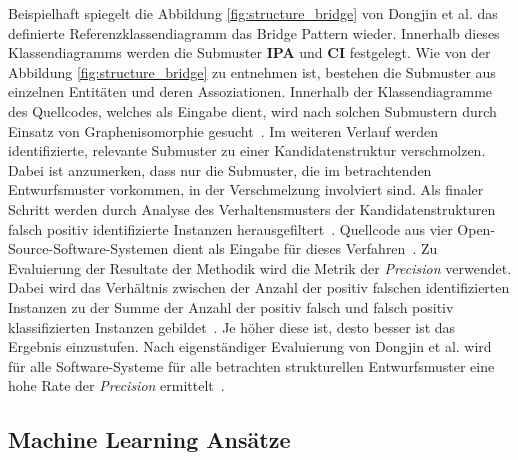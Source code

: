 Beispielhaft spiegelt die Abbildung \ref{fig:structure_bridge} von Dongjin et al. das definierte Referenzklassendiagramm das Bridge Pattern wieder. Innerhalb dieses Klassendiagramms werden die Submuster \textbf{IPA} und \textbf{CI} festgelegt. Wie von der Abbildung \ref{fig:structure_bridge} zu entnehmen ist, bestehen die Submuster aus einzelnen Entitäten und deren Assoziationen.
Innerhalb der Klassendiagramme des Quellcodes, welches als Eingabe dient, wird nach solchen Submustern durch Einsatz von Graphenisomorphie gesucht~\cite[S. 584]{6649882}. Im weiteren Verlauf werden identifizierte, relevante Submuster zu einer Kandidatenstruktur verschmolzen. Dabei ist anzumerken, dass nur die Submuster, die im betrachtenden Entwurfsmuster vorkommen, in der Verschmelzung involviert sind.
Als finaler Schritt werden durch Analyse des Verhaltensmusters der Kandidatenstrukturen falsch positiv identifizierte Instanzen herausgefiltert~\cite[S. 584]{6649882}. Quellcode aus vier Open-Source-Software-Systemen dient als Eingabe für dieses Verfahren~\cite[S. 585]{6649882}. 
Zu Evaluierung der Resultate der Methodik wird die Metrik der \textit{Precision} verwendet. Dabei wird das Verhältnis zwischen der Anzahl der positiv falschen identifizierten Instanzen zu der Summe der Anzahl der positiv falsch und falsch positiv klassifizierten Instanzen gebildet~\cite[S. 585]{6649882}. Je höher diese ist, desto besser ist das Ergebnis einzustufen.
Nach eigenständiger Evaluierung von Dongjin et al. wird für alle Software-Systeme für alle betrachten strukturellen Entwurfsmuster eine hohe Rate der \textit{Precision} ermittelt~\cite[S. 586]{6649882}.


\pagebreak

\subsection{Machine Learning Ansätze}

